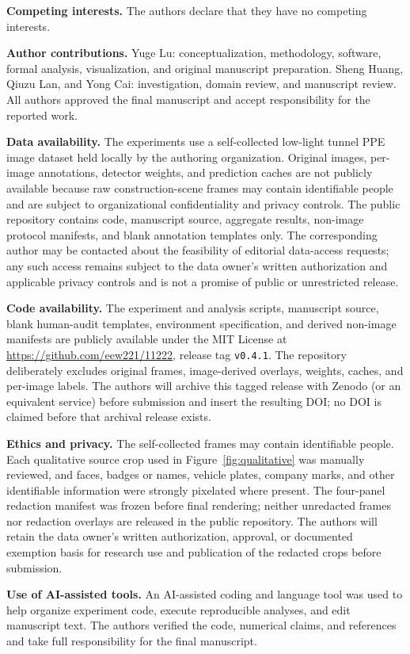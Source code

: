 \documentclass[iicol,pdflatex,sn-mathphys-num]{sn-jnl}
\begin{document}
\textbf{Competing interests.} The authors declare that they have no competing interests.

\textbf{Author contributions.} Yuge Lu: conceptualization, methodology, software, formal analysis, visualization, and original manuscript preparation. Sheng Huang, Qiuzu Lan, and Yong Cai: investigation, domain review, and manuscript review. All authors approved the final manuscript and accept responsibility for the reported work.

\textbf{Data availability.} The experiments use a self-collected low-light tunnel PPE image dataset held locally by the authoring organization. Original images, per-image annotations, detector weights, and prediction caches are not publicly available because raw construction-scene frames may contain identifiable people and are subject to organizational confidentiality and privacy controls. The public repository contains code, manuscript source, aggregate results, non-image protocol manifests, and blank annotation templates only. The corresponding author may be contacted about the feasibility of editorial data-access requests; any such access remains subject to the data owner's written authorization and applicable privacy controls and is not a promise of public or unrestricted release.

\textbf{Code availability.} The experiment and analysis scripts, manuscript source, blank human-audit templates, environment specification, and derived non-image manifests are publicly available under the MIT License at \url{https://github.com/eew221/11222}, release tag \texttt{v0.4.1}. The repository deliberately excludes original frames, image-derived overlays, weights, caches, and per-image labels. The authors will archive this tagged release with Zenodo (or an equivalent service) before submission and insert the resulting DOI; no DOI is claimed before that archival release exists.

\textbf{Ethics and privacy.} The self-collected frames may contain identifiable people. Each qualitative source crop used in Figure~\ref{fig:qualitative} was manually reviewed, and faces, badges or names, vehicle plates, company marks, and other identifiable information were strongly pixelated where present. The four-panel redaction manifest was frozen before final rendering; neither unredacted frames nor redaction overlays are released in the public repository. The authors will retain the data owner's written authorization, approval, or documented exemption basis for research use and publication of the redacted crops before submission.

\textbf{Use of AI-assisted tools.} An AI-assisted coding and language tool was used to help organize experiment code, execute reproducible analyses, and edit manuscript text. The authors verified the code, numerical claims, and references and take full responsibility for the final manuscript.


\end{document}
